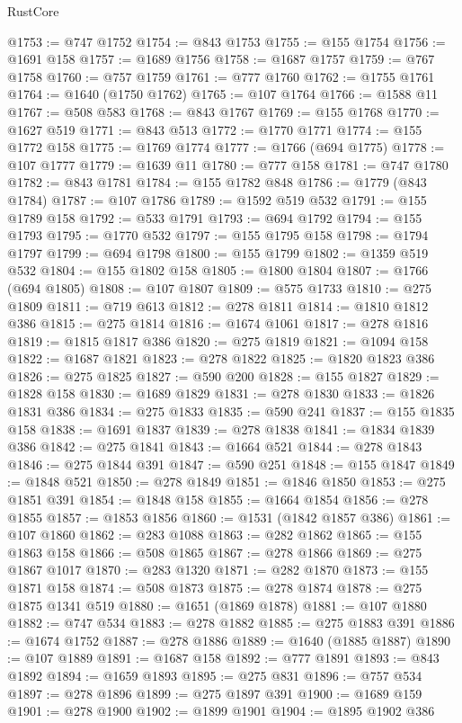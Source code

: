 \begin{lexlean}{RustCore}
\begin{coremodule}
@1753 := @747 @1752
@1754 := @843 @1753
@1755 := @155 @1754
@1756 := @1691 @158
@1757 := @1689 @1756
@1758 := @1687 @1757
@1759 := @767 @1758
@1760 := @757 @1759
@1761 := @777 @1760
@1762 := @1755 @1761
@1764 := @1640 (@1750 @1762)
@1765 := @107 @1764
@1766 := @1588 @11
@1767 := @508 @583
@1768 := @843 @1767
@1769 := @155 @1768
@1770 := @1627 @519
@1771 := @843 @513
@1772 := @1770 @1771
@1774 := @155 @1772 @158
@1775 := @1769 @1774
@1777 := @1766 (@694 @1775)
@1778 := @107 @1777
@1779 := @1639 @11
@1780 := @777 @158
@1781 := @747 @1780
@1782 := @843 @1781
@1784 := @155 @1782 @848
@1786 := @1779 (@843 @1784)
@1787 := @107 @1786
@1789 := @1592 @519 @532
@1791 := @155 @1789 @158
@1792 := @533 @1791
@1793 := @694 @1792
@1794 := @155 @1793
@1795 := @1770 @532
@1797 := @155 @1795 @158
@1798 := @1794 @1797
@1799 := @694 @1798
@1800 := @155 @1799
@1802 := @1359 @519 @532
@1804 := @155 @1802 @158
@1805 := @1800 @1804
@1807 := @1766 (@694 @1805)
@1808 := @107 @1807
@1809 := @575 @1733
@1810 := @275 @1809
@1811 := @719 @613
@1812 := @278 @1811
@1814 := @1810 @1812 @386
@1815 := @275 @1814
@1816 := @1674 @1061
@1817 := @278 @1816
@1819 := @1815 @1817 @386
@1820 := @275 @1819
@1821 := @1094 @158
@1822 := @1687 @1821
@1823 := @278 @1822
@1825 := @1820 @1823 @386
@1826 := @275 @1825
@1827 := @590 @200
@1828 := @155 @1827
@1829 := @1828 @158
@1830 := @1689 @1829
@1831 := @278 @1830
@1833 := @1826 @1831 @386
@1834 := @275 @1833
@1835 := @590 @241
@1837 := @155 @1835 @158
@1838 := @1691 @1837
@1839 := @278 @1838
@1841 := @1834 @1839 @386
@1842 := @275 @1841
@1843 := @1664 @521
@1844 := @278 @1843
@1846 := @275 @1844 @391
@1847 := @590 @251
@1848 := @155 @1847
@1849 := @1848 @521
@1850 := @278 @1849
@1851 := @1846 @1850
@1853 := @275 @1851 @391
@1854 := @1848 @158
@1855 := @1664 @1854
@1856 := @278 @1855
@1857 := @1853 @1856
@1860 := @1531 (@1842 @1857 @386)
@1861 := @107 @1860
@1862 := @283 @1088
@1863 := @282 @1862
@1865 := @155 @1863 @158
@1866 := @508 @1865
@1867 := @278 @1866
@1869 := @275 @1867 @1017
@1870 := @283 @1320
@1871 := @282 @1870
@1873 := @155 @1871 @158
@1874 := @508 @1873
@1875 := @278 @1874
@1878 := @275 @1875 @1341 @519
@1880 := @1651 (@1869 @1878)
@1881 := @107 @1880
@1882 := @747 @534
@1883 := @278 @1882
@1885 := @275 @1883 @391
@1886 := @1674 @1752
@1887 := @278 @1886
@1889 := @1640 (@1885 @1887)
@1890 := @107 @1889
@1891 := @1687 @158
@1892 := @777 @1891
@1893 := @843 @1892
@1894 := @1659 @1893
@1895 := @275 @831
@1896 := @757 @534
@1897 := @278 @1896
@1899 := @275 @1897 @391
@1900 := @1689 @159
@1901 := @278 @1900
@1902 := @1899 @1901
@1904 := @1895 @1902 @386

\end{coremodule}
\end{lexlean}

